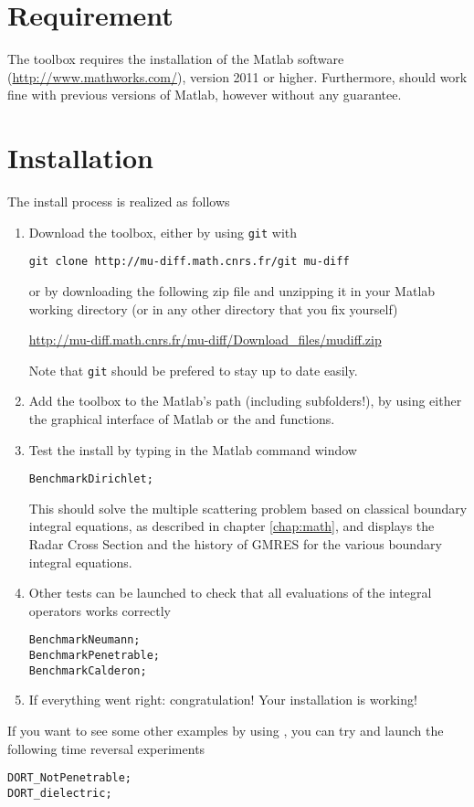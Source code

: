 
\section*{Requirement}

The toolbox \mudiff requires the installation of the Matlab software (\url{http://www.mathworks.com/}), version 2011 or higher. Furthermore,
\mudiff should work fine with previous versions of Matlab, however without any guarantee.

\section*{Installation}

The install process is realized as follows
\begin{enumerate}
\item Download the \mudiff toolbox, either by using \texttt{git} with
\begin{verbatim}
git clone http://mu-diff.math.cnrs.fr/git mu-diff
\end{verbatim} 
or by downloading the following zip file and unzipping it in your Matlab working directory (or in any other directory that you fix yourself)
\begin{center}
\url{http://mu-diff.math.cnrs.fr/mu-diff/Download_files/mudiff.zip}
\end{center}
Note that \texttt{git} should be prefered to stay up to date easily.
\item Add the \mudiff toolbox to the Matlab's path (including subfolders!), by using either the graphical interface of Matlab or the  and  functions.
\item Test the \mudiff install by typing in the Matlab command window
\begin{lstlisting}
BenchmarkDirichlet;
\end{lstlisting}
This should solve the multiple scattering problem based on classical boundary integral equations, as described in chapter \ref{chap:math}, 
and displays the Radar Cross Section and the history of GMRES for the various boundary integral equations.
\item Other tests can be launched to check that all evaluations of the integral operators works correctly
\begin{lstlisting}
BenchmarkNeumann;
BenchmarkPenetrable;
BenchmarkCalderon;
\end{lstlisting}
\item If everything went right: congratulation! Your \mudiff installation is  working!
\end{enumerate}

If you want to see some other examples by using \mudiff, you can try and launch the following time reversal experiments
\begin{lstlisting}
DORT_NotPenetrable;
DORT_dielectric;
\end{lstlisting}
